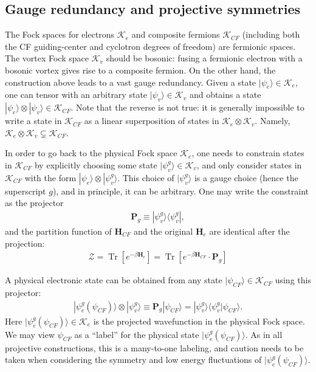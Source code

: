 \subsection{Gauge redundancy and projective symmetries}
The Fock spaces for electrons $\mathcal K_e$ and composite fermions $\mathcal K_{CF}$ (including both the CF guiding-center and cyclotron degrees of freedom) are fermionic spaces. The vortex Fock space $\mathcal K_v$ should be bosonic: fusing a fermionic electron with a bosonic vortex gives rise to a composite fermion. On the other hand, the construction above leads to a vast gauge redundancy. Given a state $|\psi_e\rangle\in \mathcal K_e$, one can tensor with an arbitrary state $|\psi_v\rangle\in \mathcal K_v$ and obtains a state $|\psi_e\rangle\otimes|\psi_v\rangle \in \mathcal K_{CF}$. Note that the reverse is not true: it is generally impossible to write a state in $\mathcal K_{CF}$ as a linear superposition of states in $\mathcal K_e\otimes \mathcal K_v$. Namely, $\mathcal K_e\otimes \mathcal K_v\subsetneq \mathcal K_{CF}$.

In order to go back to the physical Fock space $\mathcal K_e$, one needs to constrain states in $\mathcal K_{CF}$ by explicitly choosing some state $|\psi_v^g\rangle\in \mathcal K_v$, and only consider states in $\mathcal K_{CF}$ with the form $|\psi_e\rangle\otimes |\psi_v^g\rangle$. This choice of $|\psi_v^g\rangle$ is a gauge choice (hence the superscript $g$), and in principle, it can be arbitrary. One may write the constraint as the projector
\begin{align}
\mathbf P_g\equiv |\psi_v^g\rangle\langle\psi_v^g|,
\end{align}
and the partition function of $\mathbf H_{CF}$ and the original $\mathbf H_e$ are identical after the projection:
\begin{align}
\mathcal Z=\mathop{\mathrm{Tr}}[e^{-\beta \mathbf H_e}]=\mathop{\mathrm{Tr}}[ e^{-\beta \mathbf H_{CF}} \cdot \mathbf P_g]\label{eq:full_constraint}
\end{align}

A physical electronic state can be obtained from any state $|\psi_{CF}\rangle\in\mathcal K_{CF}$ using this projector:
\begin{align}
|\psi^g_e(\psi_{CF})\rangle\otimes|\psi_v^g\rangle\equiv \mathbf P_g |\psi_{CF}\rangle =|\psi_v^g\rangle\langle\psi_v^g|\psi_{CF}\rangle.\label{eq:projection_ket}
\end{align}
Here $|\psi^g_e(\psi_{CF})\rangle\in \mathcal K_e$ is the projected wavefunction in the physical Fock space. We may view $\psi_{CF}$ as a ``label'' for the physical state $|\psi^g_e(\psi_{CF})\rangle$. As in all projective constructions, this is a many-to-one labeling, and caution needs to be taken when considering the symmetry and low energy fluctuations of $|\psi^g_e(\psi_{CF})\rangle$.

